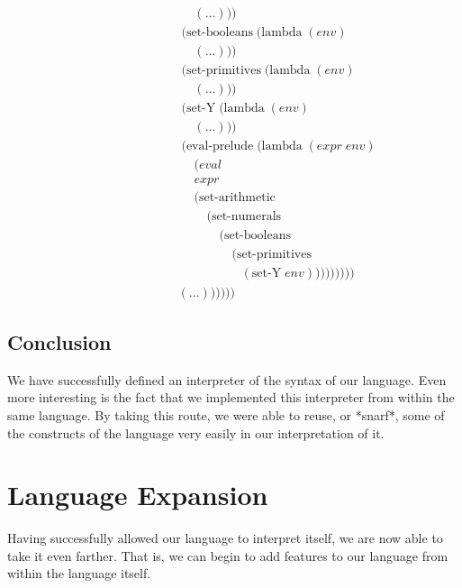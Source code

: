 \begin{align*}
\\& \qquad \qquad \qquad \quad \; (\dots)))
\\& \qquad \qquad \qquad \; (\text{set-booleans} \; (\text{lambda} \; (env)
\\& \qquad \qquad \qquad \quad \; (\dots)))
\\& \qquad \qquad \qquad \; (\text{set-primitives} \; (\text{lambda} \; (env)
\\& \qquad \qquad \qquad \quad \; (\dots)))
\\& \qquad \qquad \qquad \; (\text{set-Y} \; (\text{lambda} \; (env)
\\& \qquad \qquad \qquad \quad \; (\dots)))
\\& \qquad \qquad \qquad \; (\text{eval-prelude} \; (\text{lambda} \; (expr \; env)
\\& \qquad \qquad \qquad \quad \; (eval
\\& \qquad \qquad \qquad \quad \; expr
\\& \qquad \qquad \qquad \quad \; (\text{set-arithmetic}
\\& \qquad \qquad \qquad \qquad \; (\text{set-numerals}
\\& \qquad \qquad \qquad \qquad \quad \; (\text{set-booleans}
\\& \qquad \qquad \qquad \qquad \qquad \; (\text{set-primitives}
\\& \qquad \qquad \qquad \qquad \qquad \quad (\text{set-Y} \; env)))))))))
\\& \qquad \qquad \qquad (\dots))))))
\end{align*}

\subsection{Conclusion}
We have successfully defined an interpreter of the syntax of our language.
Even more interesting is the fact that we implemented this interpreter from
within the same language. By taking this route, we were able to reuse, or
*snarf*, some of the constructs of the language very easily in our
interpretation of it.

\section{Language Expansion}
Having successfully allowed our language to interpret itself, we are now able
to take it even farther. That is, we can begin to add features to our
language from within the language itself.

